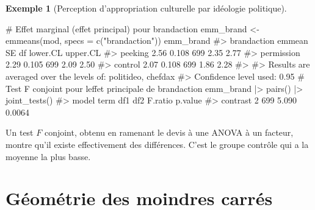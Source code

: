 \documentclass[
  11pt,
  letterpaper,
]{scrbook}
\newenvironment{Shaded}{\begin{snugshade}}{\end{snugshade}}
\newcommand{\AttributeTok}[1]{\textcolor[rgb]{0.40,0.45,0.13}{#1}}
\newcommand{\CommentTok}[1]{\textcolor[rgb]{0.37,0.37,0.37}{#1}}
\newcommand{\FunctionTok}[1]{\textcolor[rgb]{0.28,0.35,0.67}{#1}}
\newcommand{\NormalTok}[1]{\textcolor[rgb]{0.00,0.23,0.31}{#1}}
\newcommand{\OtherTok}[1]{\textcolor[rgb]{0.00,0.23,0.31}{#1}}
\newcommand{\SpecialCharTok}[1]{\textcolor[rgb]{0.37,0.37,0.37}{#1}}
\newcommand{\StringTok}[1]{\textcolor[rgb]{0.13,0.47,0.30}{#1}}
\theoremstyle{plain}
\theoremstyle{plain}
\theoremstyle{definition}
\newtheorem{example}{Exemple}[chapter]
\theoremstyle{definition}
\theoremstyle{remark}
\begin{document}
\begin{example}[Perception d'appropriation culturelle par idéologie
politique]
\begin{Shaded}
\begin{Highlighting}[]
\CommentTok{\# Effet marginal (effet principal) pour brandaction}
\NormalTok{emm\_brand }\OtherTok{\textless{}{-}} \FunctionTok{emmeans}\NormalTok{(mod, }\AttributeTok{specs =} \FunctionTok{c}\NormalTok{(}\StringTok{"brandaction"}\NormalTok{)) }
\NormalTok{emm\_brand}
\CommentTok{\#\textgreater{}  brandaction emmean    SE  df lower.CL upper.CL}
\CommentTok{\#\textgreater{}  peeking       2.56 0.108 699     2.35     2.77}
\CommentTok{\#\textgreater{}  permission    2.29 0.105 699     2.09     2.50}
\CommentTok{\#\textgreater{}  control       2.07 0.108 699     1.86     2.28}
\CommentTok{\#\textgreater{} }
\CommentTok{\#\textgreater{} Results are averaged over the levels of: politideo, chefdax }
\CommentTok{\#\textgreater{} Confidence level used: 0.95}
\CommentTok{\# Test F conjoint pour l\textquotesingle{}effet principale de brandaction}
\NormalTok{emm\_brand }\SpecialCharTok{|\textgreater{}} \FunctionTok{pairs}\NormalTok{() }\SpecialCharTok{|\textgreater{}} \FunctionTok{joint\_tests}\NormalTok{()}
\CommentTok{\#\textgreater{}  model term df1 df2 F.ratio p.value}
\CommentTok{\#\textgreater{}  contrast     2 699   5.090  0.0064}
\end{Highlighting}
\end{Shaded}

Un test \(F\) conjoint, obtenu en ramenant le devis à une ANOVA à un
facteur, montre qu'il existe effectivement des différences. C'est le
groupe contrôle qui a la moyenne la plus basse.

\end{example}

\section{Géométrie des moindres
carrés}\label{guxe9omuxe9trie-des-moindres-carruxe9s}
\end{document}
